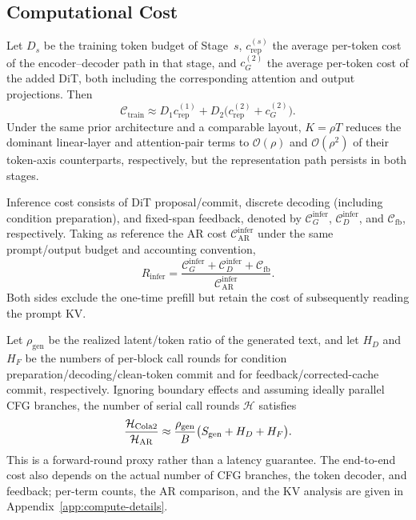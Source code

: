 \subsection{Computational Cost}
\label{sec:cost}

Let $D_s$ be the training token budget of Stage~$s$, $c_{\mathrm{rep}}^{(s)}$ the average per-token cost of the encoder--decoder path in that stage, and $c_G^{(2)}$ the average per-token cost of the added DiT, both including the corresponding attention and output projections. Then
\begin{equation}
    \mathcal C_{\mathrm{train}}
    \approx
    D_1c_{\mathrm{rep}}^{(1)}
    +D_2\big(c_{\mathrm{rep}}^{(2)}+c_G^{(2)}\big).
    \label{eq:cost-train-total}
\end{equation}
Under the same prior architecture and a comparable layout, $K=\rho T$ reduces the dominant linear-layer and attention-pair terms to $\mathcal O(\rho)$ and $\mathcal O(\rho^2)$ of their token-axis counterparts, respectively, but the representation path persists in both stages.

Inference cost consists of DiT proposal/commit, discrete decoding (including condition preparation), and fixed-span feedback, denoted by $\mathcal C_G^{\mathrm{infer}}$, $\mathcal C_D^{\mathrm{infer}}$, and $\mathcal C_{\mathrm{fb}}$, respectively. Taking as reference the AR cost $\mathcal C_{\mathrm{AR}}^{\mathrm{infer}}$ under the same prompt/output budget and accounting convention,
\begin{equation}
    R_{\mathrm{infer}}
    =\frac{\mathcal C_G^{\mathrm{infer}}
           +\mathcal C_D^{\mathrm{infer}}
           +\mathcal C_{\mathrm{fb}}}
          {\mathcal C_{\mathrm{AR}}^{\mathrm{infer}}}.
    \label{eq:cost-infer-ratio}
\end{equation}
Both sides exclude the one-time prefill but retain the cost of subsequently reading the prompt KV.

Let $\rho_{\mathrm{gen}}$ be the realized latent/token ratio of the generated text, and let $H_D$ and $H_F$ be the numbers of per-block call rounds for condition preparation/decoding/clean-token commit and for feedback/corrected-cache commit, respectively. Ignoring boundary effects and assuming ideally parallel CFG branches, the number of serial call rounds $\mathcal H$ satisfies
\begin{equation}
    \frac{\mathcal H_{\text{Cola2}}}{\mathcal H_{\mathrm{AR}}}
    \approx
    \frac{\rho_{\mathrm{gen}}}{B}
    \big(S_{\mathrm{gen}}+H_D+H_F\big).
    \label{eq:cost-depth}
\end{equation}
This is a forward-round proxy rather than a latency guarantee. The end-to-end cost also depends on the actual number of CFG branches, the token decoder, and feedback; per-term counts, the AR comparison, and the KV analysis are given in Appendix~\ref{app:compute-details}.
